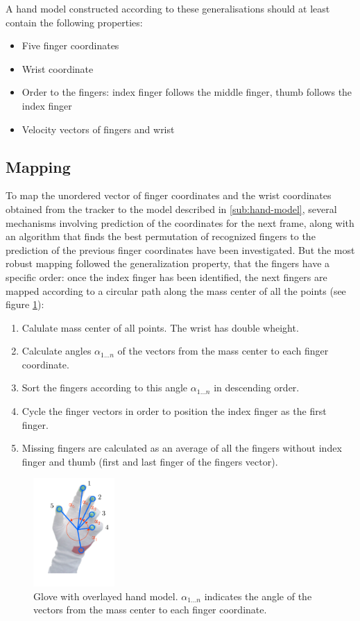 A hand model constructed according to these generalisations should at least contain the following properties:
\begin{itemize}
\item Five finger coordinates
\item Wrist coordinate
\item Order to the fingers: index finger follows the middle finger, thumb follows the index finger
\item Velocity vectors of fingers and wrist
\end{itemize}

\subsection{Mapping}
\label{sub:mapping}

To map the unordered vector of finger coordinates and the wrist coordinates obtained from the tracker to the model described in \ref{sub:hand-model}, several mechanisms involving prediction of the coordinates for the next frame, along with an algorithm that finds the best permutation of recognized fingers to the prediction of the previous finger coordinates have been investigated. But the most robust mapping followed the generalization property, that the fingers have a specific order: once the index finger has been identified, the next fingers are mapped according to a circular path along the mass center of all the points (see figure \ref{fig:hand-model}):

\begin{enumerate}
\item Calulate mass center of all points. The wrist has double wheight.
\item Calculate angles $\alpha_{1\ldots n}$ of the vectors from the mass center to each finger coordinate.
\item Sort the fingers according to this angle $\alpha_{1\ldots n}$ in descending order.
\item Cycle the finger vectors in order to position the index finger as the first finger.
\item Missing fingers are calculated as an average of all the fingers without index finger and thumb (first and last finger of the fingers vector).
\end{enumerate}

\begin{figure}[H]
\center
\includegraphics[width=0.275\textwidth]{images/hand-model} 
\caption{Glove with overlayed hand model. $\alpha_{1\ldots n}$ indicates the angle of the vectors from the mass center to each finger coordinate. }
\label{fig:hand-model}
\end{figure}

